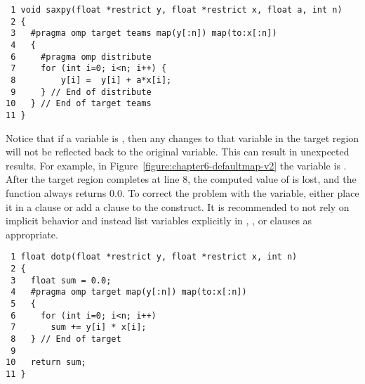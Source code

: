 \begin{figure*}[!tb]
\begin{verbatim}
 1 void saxpy(float *restrict y, float *restrict x, float a, int n)
 2 {
 3   #pragma omp target teams map(y[:n]) map(to:x[:n]) 
 4   {
 6     #pragma omp distribute 
 7     for (int i=0; i<n; i++) {
 8         y[i] =  y[i] + a*x[i];
 9     } // End of distribute
10   } // End of target teams
11 }
\end{verbatim}
\caption{ \textbf {Example of default data-mapping attribute rules} -- \small
          The pointer variables \texttt{x} and \texttt{y} are \texttt{private}. The 
          scalar variables \texttt{a} and \texttt{n} are \texttt{firstprivate}.
         }
\label{figure:chapter6-defaultmap-v1}
\end{figure*}

Notice that if a variable is , then any changes to that variable in
the target region will not be reflected back to the original variable.  This
can result in unexpected results.  For example, in
Figure~\ref{figure:chapter6-defaultmap-v2} the variable  is .
After the target region completes at line $8$, the computed value of  is
lost, and the  function always returns $0.0$.
To correct the problem with the  variable, either place
it in a  clause or add a 
clause to the  construct.  It is recommended to not
rely on implicit behavior and instead list variables explicitly in ,
, or  clauses as appropriate.

\begin{figure*}[!tb]
\begin{verbatim}
 1 float dotp(float *restrict y, float *restrict x, int n)
 2 {
 3   float sum = 0.0;
 4   #pragma omp target map(y[:n]) map(to:x[:n])
 5   {
 6     for (int i=0; i<n; i++)
 7       sum += y[i] * x[i];
 8   } // End of target
 9
10   return sum;
11 }
\end{verbatim}
\caption{ \textbf {Example of problems with implicit firstprivate variables} -- \small
          Because the variable \texttt{sum} is \texttt{firstprivate}, the computed value
          of \texttt{sum} is lost at the end of the target region.
         }
\label{figure:chapter6-defaultmap-v2}
\end{figure*}

